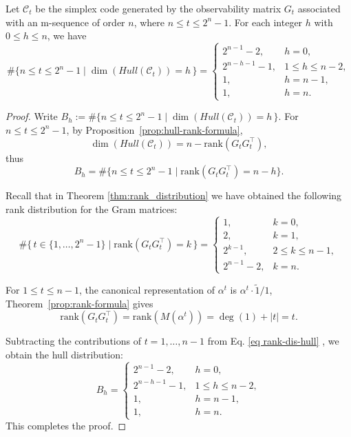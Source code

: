 \documentclass[hidelinks,onefignum,onetabnum]{siamart251216}
\theoremstyle{definition}
\theoremstyle{remark}
\providecommand{\rank}{{\mathrm{rank}}}
\begin{document}
\begin{proposition}\label{prop:hull-distribution-Ct}
Let $\mathcal{C}_t$ be the simplex code generated by the observability matrix $G_{t}$ associated with an m-sequence of order $n$, where $n\le t\le 2^{n}-1$. For each integer $h$ with $0\le h\le n$, we have
\[
\#\{n\le t\le 2^{n}-1 \mid \dim(\textit{Hull}(\mathcal{C}_t))=h\,\}=
	\begin{cases}
		2^{n-1}-2, & h=0,\\[1mm]
		2^{n-h-1}-1, & 1\le h\le n-2,\\[1mm]
		1, & h=n-1,\\[1mm]
		1, & h=n.
	\end{cases}
\]
\end{proposition}
\begin{proof}
	
Write $B_h:=\#\{n\le t\le 2^{n}-1 \mid \dim(\textit{Hull}(\mathcal{C}_t))=h\,\}$. For $n\le t\le 2^n-1$, by Proposition~\ref{prop:hull-rank-formula}, 
	\[
	\dim(\textit{Hull}(\mathcal{C}_t))=n-\rank(G_tG_t^\top),
	\]
thus  $$B_h=\#\{n\le t\le 2^n-1\mid \rank(G_tG_t^\top)=n-h\}.$$

Recall that in Theorem \ref{thm:rank_distribution}
we have obtained the following rank distribution for the Gram matrices:
\begin{equation}\label{eq rank-dis-hull}
\#\{\,t\in\{1,\dots,2^n-1\}\mid \rank(G_tG_t^\top)=k\,\}
=
\begin{cases}
	1, & k=0,\\[1mm]
	2, & k=1,\\[1mm]
	2^{k-1}, & 2\le k\le n-1,\\[1mm]
	2^{n-1}-2, & k=n.
\end{cases}
\end{equation}

	For $1\le t\le n-1$, the canonical representation of $\alpha^t$ is $\alpha^t\cdot\widetilde{1}/1$, Theorem~\ref{prop:rank-formula} gives
	\[
	\rank(G_tG_t^\top)=\rank(M(\alpha^t))=\deg(1)+|t|=t.
	\]

	 Subtracting the contributions of $t=1,\dots,n-1$ from Eq. \eqref{eq rank-dis-hull} , we obtain the hull distribution:
\[
B_h=
\begin{cases}
	2^{n-1}-2, & h=0,\\[1mm]
	2^{n-h-1}-1, & 1\le h\le n-2,\\[1mm]
	1, & h=n-1,\\[1mm]
	1, & h=n.
\end{cases}
\]
	This completes the proof.
\end{proof}
\end{document}
